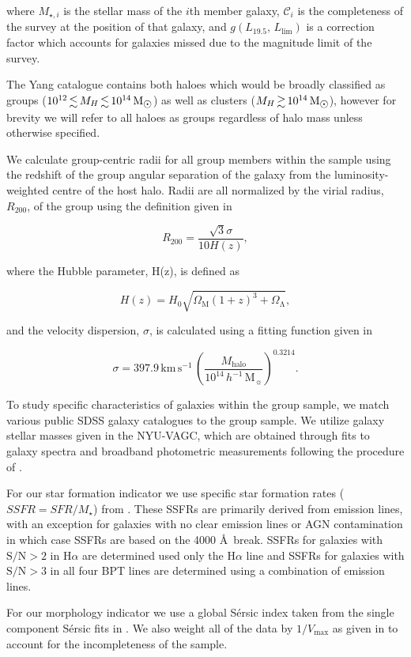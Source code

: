 \documentclass[a4paper,fleqn,usenatbib]{mnras}
\newcommand{\Msun}{\,\mathrm{M_{\sun}}}
\begin{document}
\noindent
where $M_{\star,i}$ is the stellar mass of the $i$th member galaxy,
$\mathcal{C}_i$ is the completeness of the survey at the position of
that galaxy, and $g(L_{19.5},\,L_{\text{lim}})$ is a correction factor
which accounts for galaxies missed due to the magnitude limit of the
survey.
\par
The Yang catalogue contains both haloes which would be broadly classified as
groups ($10^{12} \la M_H \la 10^{14}\Msun$) as well as clusters ($M_H
\ga 10^{14}\Msun$), however for brevity we will refer to all haloes as
groups regardless of halo mass unless otherwise specified.
\par
We calculate group-centric radii for all group members within the
sample using the redshift of the group angular separation of the galaxy from the
luminosity-weighted centre of the host halo.  Radii are
all normalized by the virial radius, $R_{200}$, of the group using the
definition given in \citet{carlberg1997}

\begin{equation}
  R_{200} = \frac{\sqrt{3} \sigma}{10 H(z)},
\end{equation}

\noindent
where the Hubble parameter, H(z), is defined as

\begin{equation}
  H(z) = H_0 \sqrt{\Omega_\mathrm{M} (1+z)^3 +
    \Omega_\mathrm{\Lambda}},
\end{equation}

\noindent
and the velocity dispersion, $\sigma$, is calculated using a fitting
function given in \citet{yang2007}

\begin{equation}
  \sigma =
  397.9\,\mathrm{km}\,\mathrm{s^{-1}}\,\left(\frac{M_\text{halo}}{10^{14}\,h^{-1}\Msun}\right)^{0.3214}.
\end{equation}

To study specific characteristics of galaxies within the group
sample, we match various public SDSS galaxy catalogues to the group
sample.  We utilize galaxy stellar masses given in the NYU-VAGC, which
are obtained through fits to galaxy spectra and broadband photometric
measurements following the procedure of \citet{blanton2007}.
\par
For our star formation indicator we use specific star formation rates
($SSFR = SFR/M_\star$) from \citet{brinchmann2004}.  These SSFRs are
primarily derived from emission lines, with an exception for galaxies
with no clear emission lines or AGN contamination in which case SSFRs
are based on the 4000 \AA\ break.  SSFRs for galaxies with $\text{S/N}
> 2$ in H$\alpha$ are determined used only the H$\alpha$ line and
SSFRs for galaxies with $\text{S/N} > 3$ in all four BPT lines are
determined using a combination of emission lines.
\par
For our morphology indicator we use a global S\'{e}rsic
index taken from the single component S\'{e}rsic fits in
\citet{simard2011}.  We also weight all of the data by
$1/V_\text{max}$ as given in \citet{simard2011} to account for the
incompleteness of the sample. 
\end{document}
